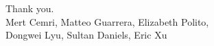 \documentclass[10pt,aspectratio=169]{beamer}
\begin{document}
\begin{frame}
\vfill
\begin{center}
{\Large Thank you.}\\[1.5em]
{\small\color{black!60} Mert Cemri, Matteo Guarrera, Elizabeth Polito,\\
Dongwei Lyu, Sultan Daniels, Eric Xu}
\end{center}
\vfill
\end{frame}
\end{document}
